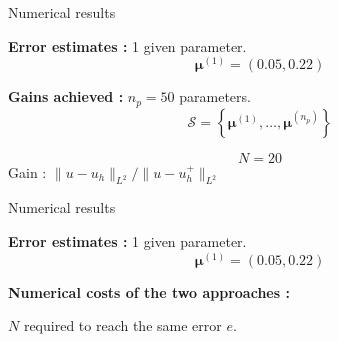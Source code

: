 \begin{frame}[noframenumbering]{Numerical results}
	\hspace{-5pt}\begin{minipage}[t]{0.46\linewidth}
		\textbf{Error estimates :} 1 given parameter.
		$$\bm{\mu}^{(1)}=(0.05, 0.22) $$
		\vspace{-35pt}
		\begin{figure}[H]
		\end{figure}
	\end{minipage} \qquad \small
	\begin{minipage}[t]{0.48\linewidth}
		\textbf{Gains achieved :} $n_p=50$ parameters.
		$$\mathcal{S}=\left\{\bm{\mu}^{(1)},\dots,\bm{\mu}^{(n_p)}\right\}$$
		\begin{table}[H]
		\end{table}

		\normalsize\centering\vspace{-20pt}
		$$N=20$$
		Gain : $\| u-u_h\|_{L^2} / \| u-u_h^+\|_{L^2}$
	\end{minipage}
\end{frame}

\begin{frame}[noframenumbering]{Numerical results}
	\hspace{-5pt}\begin{minipage}[t]{0.46\linewidth}
		\textbf{Error estimates :} 1 given parameter.
		$$\bm{\mu}^{(1)}=(0.05, 0.22) $$
		\vspace{-35pt}
		\begin{figure}[H]
		\end{figure}
	\end{minipage} \qquad \small
	\begin{minipage}[t]{0.48\linewidth}
		\textbf{Numerical costs of the two approaches :}

		\centering
		\vspace{8pt}
		$N$ required to reach the same error $e$.
		\vspace{10pt}
		\begin{table}[H]
			\centering
		\end{table}
	\end{minipage}
\end{frame}
